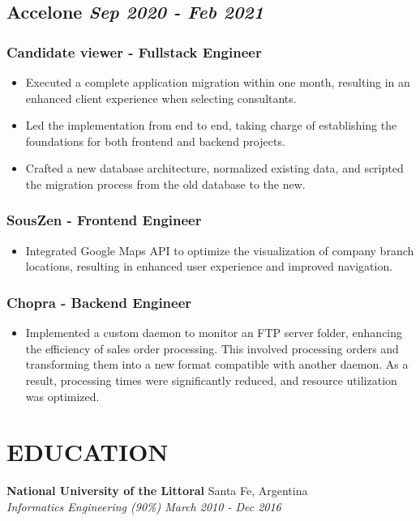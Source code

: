 \documentclass[12pt, letterpaper]{article}
\begin{document}
\subsection*{Accelone \hfill \small \textit{Sep 2020 - Feb 2021}}

\subsubsection*{Candidate viewer - Fullstack Engineer}
\begin{itemize}
    \setlength\itemsep{0em}
    \item Executed a complete application migration within one month, resulting in an enhanced client experience when selecting consultants.
    \item Led the implementation from end to end, taking charge of establishing the foundations for both frontend and backend projects.
    \item Crafted a new database architecture, normalized existing data, and scripted the migration process from the old database to the new.
\end{itemize}

\subsubsection*{SousZen - Frontend Engineer}
\begin{itemize}
    \setlength\itemsep{0em}
    \item Integrated Google Maps API to optimize the visualization of company branch locations, resulting in enhanced user experience and improved navigation.
\end{itemize}

\subsubsection*{Chopra - Backend Engineer}
\begin{itemize}
    \setlength\itemsep{0em}
    \item Implemented a custom daemon to monitor an FTP server folder, enhancing the efficiency of sales order processing. This involved processing orders and transforming them into a new format compatible with another daemon. As a result, processing times were significantly reduced, and resource utilization was optimized.
\end{itemize}

\section{EDUCATION}

\textbf{National University of the Littoral} \hfill Santa Fe, Argentina \\
\textit{Informatics Engineering (90\%) \hfill March 2010 - Dec 2016} 
\end{document}
